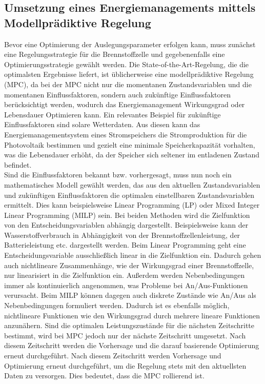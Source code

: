 

\subsection{Umsetzung eines Energiemanagements mittels Modellprädiktive Regelung}
Bevor eine Optimierung der Auslegungsparameter erfolgen kann, muss zunächst eine Regelungsstrategie für die Brennstoffzelle und gegebenenfalls eine Optimierungsstrategie gewählt werden. 
Die State-of-the-Art-Regelung, die die optimalsten Ergebnisse liefert, ist üblicherweise eine modellprädiktive Regelung (MPC), da bei der MPC nicht nur die momentanen Zustandsvariablen und die momentanen Einflussfaktoren, sondern auch zukünftige Einflussfaktoren berücksichtigt werden, wodurch das Energiemanagement Wirkungsgrad oder Lebensdauer Optimieren kann. Ein relevantes Beispiel für zukünftige Einflussfaktoren sind solare Wetterdaten. Aus diesen kann das Energiemanagementsystem eines Stromspeichers die Stromproduktion für die Photovoltaik bestimmen und gezielt eine minimale Speicherkapazität vorhalten, was die Lebensdauer erhöht, da der Speicher sich seltener im entladenen Zustand befindet. \\ 
Sind die Einflussfaktoren bekannt bzw. vorhergesagt, muss nun noch ein mathematisches Modell gewählt werden, das aus den aktuellen Zustandsvariablen und zukünftigen Einflussfaktoren die optimalen einstellbaren Zustandsvariablen ermittelt. Dies kann beispielsweise Linear Programming (LP) oder Mixed Integer Linear Programming (MILP) sein. Bei beiden Methoden wird die Zielfunktion von den Entscheidungsvariablen abhängig dargestellt. Beispielsweise kann der Wasserstoffverbrauch in Abhängigkeit von der Brennstoffzellenleistung, der Batterieleistung etc. dargestellt werden. Beim Linear Programming geht eine Entscheidungsvariable ausschließlich linear in die Zielfunktion ein. Dadurch gehen auch nichtlineare Zusammenhänge, wie der Wirkungsgrad einer Brennstoffzelle, nur linearisiert in die Zielfunktion ein. Außerdem werden Nebenbedingungen immer als kontinuierlich angenommen, was Probleme bei An/Aus-Funktionen verursacht. Beim MILP können dagegen auch diskrete Zustände wie An/Aus als Nebenbedingungen formuliert werden. Dadurch ist es ebenfalls möglich, nichtlineare Funktionen wie den Wirkungsgrad durch mehrere lineare Funktionen anzunähern. Sind die optimalen Leistungszustände für die nächsten Zeitschritte bestimmt, wird bei MPC jedoch nur der nächste Zeitschritt umgesetzt. Nach diesem Zeitschritt werden die Vorhersage und die darauf basierende Optimierung erneut durchgeführt. Nach diesem Zeitschritt werden Vorhersage und Optimierung erneut durchgeführt, um die Regelung stets mit den aktuellsten Daten zu versorgen. Dies bedeutet, dass die MPC rollierend ist. \\

